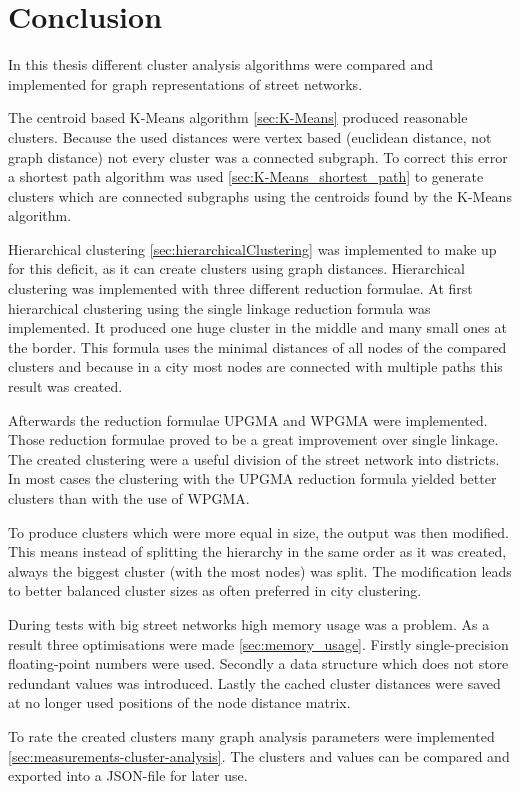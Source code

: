 \chapter{Conclusion}
In this thesis different cluster analysis algorithms were compared and implemented for graph representations of street networks.

The centroid based K-Means algorithm \ref{sec:K-Means} produced reasonable clusters. Because the used distances were vertex based (euclidean distance, not graph distance) not every cluster was a connected subgraph. To correct this error a shortest path algorithm was used \ref{sec:K-Means_shortest_path} to generate clusters which are connected subgraphs using the centroids found by the K-Means algorithm.

Hierarchical clustering \ref{sec:hierarchicalClustering} was implemented to make up for this deficit, as it can create clusters using graph distances. Hierarchical clustering was implemented with three different reduction formulae. At first hierarchical clustering using the single linkage reduction formula was implemented. It produced one huge cluster in the middle and many small ones at the border. This formula uses the minimal distances of all nodes of the compared clusters and because in a city most nodes are connected with multiple paths this result was created.

Afterwards the reduction formulae \gls{UPGMA} and \gls{WPGMA} were implemented. Those reduction formulae proved to be a great improvement over single linkage. The created clustering were a useful division of the street network into districts. In most cases the clustering with the \gls{UPGMA} reduction formula yielded better clusters than with the use of \gls{WPGMA}.

To produce clusters which were more equal in size, the output was then modified. This means instead of splitting the hierarchy in the same order as it was created, always the biggest cluster (with the most nodes) was split. The modification leads to better balanced cluster sizes as often preferred in city clustering.

During tests with big street networks high memory usage was a problem. As a result three optimisations were made \ref{sec:memory_usage}. Firstly single-precision floating-point numbers were used. Secondly a data structure which does not store redundant values was introduced. Lastly the cached cluster distances were saved at no longer used positions of the node distance matrix.

To rate the created clusters many graph analysis parameters were implemented \ref{sec:measurements-cluster-analysis}. The clusters and values can be compared and exported into a JSON-file for later use.